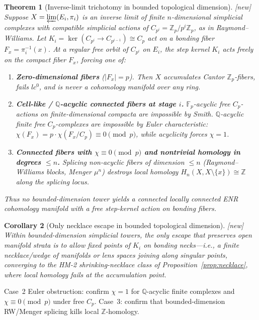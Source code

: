 \documentclass[11pt]{article}
\newtheorem{theorem}{Theorem}[section]
\newtheorem{corollary}[theorem]{Corollary}
\theoremstyle{definition}
\newcommand{\status}[1]{\textit{\textcolor{black!70}{[#1]}}}
\begin{document}
\begin{theorem}[Inverse-limit trichotomy in bounded topological dimension]
\label{thm:G}
\status{new}
Suppose $X=\varprojlim(E_i,\pi_i)$ is an inverse limit of finite
$n$-dimensional simplicial complexes with compatible simplicial actions of
$C_{p^i}=\mathbb{Z}_p/p^i\mathbb{Z}_p$, as in Raymond--Williams.  Let
$K_i=\ker(C_{p^i}\to C_{p^{i-1}})\cong C_p$ act on a bonding fiber
$F_x=\pi_i^{-1}(x)$.  At a regular free orbit of $C_{p^i}$ on $E_i$, the
step kernel $K_i$ acts freely on the compact fiber $F_x$, forcing one of:
\begin{enumerate}[label=\textbf{Case \arabic*:}]
\item \textbf{Zero-dimensional fibers} ($|F_x|=p$).
Then $X$ accumulates Cantor $\mathbb{Z}_p$-fibers, fails $lc^0$, and is never
a cohomology manifold over any ring.
\item \textbf{Cell-like / $\mathbb{Q}$-acyclic connected fibers at stage $i$.}
$\mathbb{F}_p$-acyclic free $C_p$-actions on finite-dimensional compacta are
impossible by Smith.  $\mathbb{Q}$-acyclic finite free $C_p$-complexes are
impossible by Euler characteristic:
$\chi(F_x)=p\cdot\chi(F_x/C_p)\equiv 0\pmod{p}$, while acyclicity forces
$\chi=1$.
\item \textbf{Connected fibers with $\chi\equiv 0\pmod{p}$ and nontrivial
homology in degrees $\le n$.}
Splicing non-acyclic fibers of dimension $\le n$ (Raymond--Williams blocks,
Menger $\mu^n$) destroys local homology
$H_n(X,X\setminus\{x\})\cong\mathbb{Z}$ along the splicing locus.
\end{enumerate}
Thus no bounded-dimension tower yields a connected locally connected ENR
cohomology manifold with a free step-kernel action on bonding fibers.
\end{theorem}

\begin{corollary}[Only necklace escape in bounded topological dimension]
\label{cor:H}
\status{new}
Within bounded-dimension simplicial towers, the only escape that preserves open
manifold strata is to allow fixed points of $K_i$ on bonding necks---i.e., a
finite necklace/wedge of manifolds or lens spaces joining along singular
points, converging to the HM-2 shrinking-necklace class of
Proposition~\ref{prop:necklace}, where local homology fails at the accumulation
point.
\end{corollary}

\begin{checkboxenv}
Case~2 Euler obstruction: confirm $\chi=1$ for $\mathbb{Q}$-acyclic finite
complexes and $\chi\equiv 0\pmod{p}$ under free $C_p$.  Case~3: confirm that
bounded-dimension RW/Menger splicing kills local $\mathbb{Z}$-homology.
\end{checkboxenv}
\end{document}
